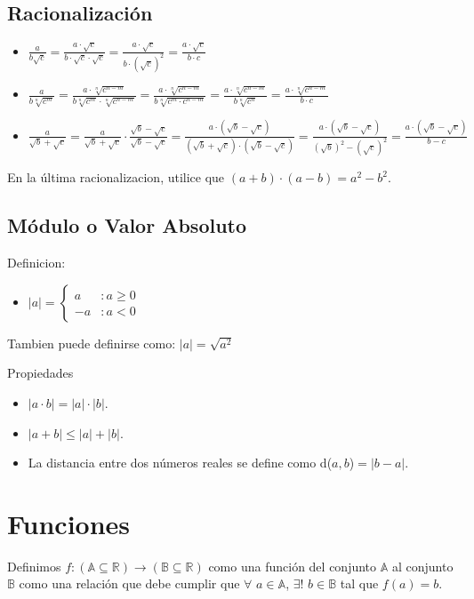 \documentclass[%
 aip,
 jmp,%
 amsmath,amssymb,
 reprint,%
]{revtex4-1}
\begin{document}
\subsection{Racionalización}

\begin{itemize}
\item $\frac{a}{b \sqrt{c}} = \frac{a \cdot \sqrt{c}}{b \cdot \sqrt{c}\cdot \sqrt{c}} = \frac{a \cdot \sqrt{c}}{b \cdot (\sqrt{c})^2} = \frac{a \cdot \sqrt{c}}{b \cdot c}$
\item $\frac{a}{b \sqrt[n]{c^m}} = \frac{a \cdot \sqrt[n]{c^{n-m}}}{b \sqrt[n]{c^m} \cdot \sqrt[n]{c^{n-m}}} = \frac{a \cdot \sqrt[n]{c^{n-m}}}{b \sqrt[n]{c^m \cdot c^{n-m}}} = \frac{a \cdot \sqrt[n]{c^{n-m}}}{b \sqrt[n]{c^n}} = \frac{a \cdot \sqrt[n]{c^{n-m}}}{b \cdot c}$
\item $\frac{a}{\sqrt{b}+\sqrt{c}} = \frac{a}{\sqrt{b} + \sqrt{c}} \cdot \frac{\sqrt{b} - \sqrt{c}}{\sqrt{b} - \sqrt{c}} = \frac{a \cdot (\sqrt{b} - \sqrt{c}) }{(\sqrt{b} + \sqrt{c}) \cdot (\sqrt{b} - \sqrt{c})} = \frac{a \cdot (\sqrt{b} - \sqrt{c})}{(\sqrt{b})^2-(\sqrt{c})^2} = \frac{a \cdot (\sqrt{b} - \sqrt{c})}{b - c}$
\end{itemize}
En la última racionalizacion, utilice que $(a+b) \cdot (a-b) = a^2 - b^2$.

\subsection{Módulo o Valor Absoluto}
Definicion:
\begin{itemize}
\item $ |a| = \left\{
 \begin{array}{lr}
  a & : a \ge 0 \\
  -a & : a <0
 \end{array}
 \right.
 $
 \end{itemize}
 
 Tambien puede definirse como: $|a| = \sqrt{a^2}$
 
 Propiedades
 \begin{itemize}
 \item $|a \cdot b| = |a| \cdot |b|$.
 \item $|a + b| \leq |a| + |b|$.
 \item La distancia entre dos números reales se define como d($a,b$)$=|b-a|$.
 
 \end{itemize}

\section{Funciones}
Definimos $f: (\mathbb{A}\subseteq \mathbb{R}) \rightarrow (\mathbb{B}\subseteq \mathbb{R})$ como una función del conjunto $\mathbb{A}$ al conjunto $\mathbb{B}$ como una relación que debe cumplir que $\forall$ $a \in \mathbb{A}$, $\exists !$ $b \in \mathbb{B}$ tal que $f(a)=b$.
\end{document}
